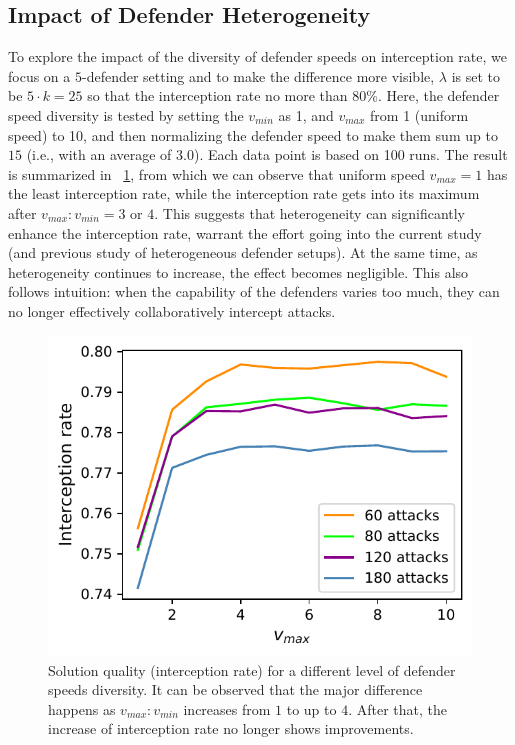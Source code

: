 \subsection{Impact of Defender Heterogeneity}
To explore the impact of the diversity of defender speeds on interception rate, we focus on a $5$-defender setting and to make the difference more visible, $\lambda$ is set to be $5\cdot k = 25$ so that the interception rate no more than 80\%. 
Here, the defender speed diversity is tested by setting the $v_{min}$ as 1, and $v_{max}$ from 1 (uniform speed) to 10, and then normalizing the defender speed to make them sum up to $15$ (i.e., with an average of $3.0$). 
Each data point is based on 100 runs. The result is summarized in ~\ref{fig:heterogeneity}, from which we can observe that uniform speed $v_{max} = 1$ has the least interception rate, while the interception rate gets into its maximum after $v_{max}:v_{min} = 3$ or $4$. This suggests that heterogeneity can significantly enhance the interception rate, warrant the effort going into the current study (and previous study of heterogeneous defender setups). At the same time, as heterogeneity continues to increase, the effect becomes negligible. This also follows intuition: when the capability of the defenders varies too much, they can no longer effectively collaboratively intercept attacks. 

\begin{figure}[h!]
    \centering
    \includegraphics[width=0.9\linewidth]{chapters/pd/fig/heterogeneity.pdf}
    \caption{Solution quality (interception rate) for a different level of defender speeds diversity. It can be observed that the major difference happens as $v_{max}:v_{min}$ increases from $1$ to up to $4$. After that, the increase of interception rate no longer shows improvements.}
    \label{fig:heterogeneity}
    \vspace{-2mm}
\end{figure}

